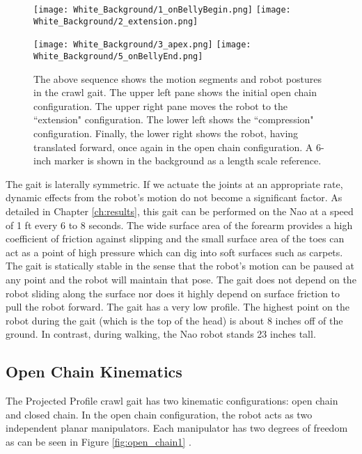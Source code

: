 \begin{figure}%
	\centerline{\texttt{[image: White\_Background/1\_onBellyBegin.png]}
				\texttt{[image: White\_Background/2\_extension.png]}
				}

	\vspace*{0.05in}

	\centerline{\texttt{[image: White\_Background/3\_apex.png]}
				\texttt{[image: White\_Background/5\_onBellyEnd.png]}
				}
	\caption{The above sequence shows the motion segments and robot postures in the crawl gait. 
				The upper left pane shows the initial open chain configuration. The upper right
				pane moves the robot to the ``extension" configuration. The lower left
				shows the ``compression" configuration. Finally, the lower right shows the 
				robot, having translated forward, once again in the open chain configuration.
				A 6-inch marker is shown in the background as a length scale reference.}
	\label{fig:nao_phases1}
\end{figure}

The gait is laterally symmetric. 
If we actuate the joints at an appropriate rate, dynamic effects from the robot's motion do not become a significant factor.
As detailed in Chapter \ref{ch:results}, this gait can be performed on the Nao at a speed of 1 ft every 6 to 8 seconds. 
The wide surface area of the forearm provides a high coefficient of friction against slipping and the small surface area of
the toes can act as a point of high pressure which can dig into soft surfaces such as carpets.
The gait is statically stable in the sense that the robot's motion can be paused at any point and the robot will maintain that pose.
The gait does not depend on the robot
sliding along the surface nor does it highly depend on surface friction to pull the robot forward.
The gait has a very low profile. The highest point on the robot during the gait (which is the top of the head)
is about 8 inches off of the ground. In contrast, during walking, the Nao robot stands 23 inches tall.

\subsection{Open Chain Kinematics}
The Projected Profile crawl gait has two kinematic configurations: open chain and closed chain. In the open chain
configuration, the robot acts as two independent planar manipulators. 
Each manipulator has two degrees of freedom as can be seen in Figure \ref{fig:open_chain1} .

